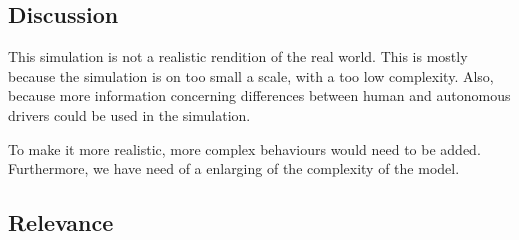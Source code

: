 

\subsection{Discussion}
\label{sub:conclusion:discussion}




This simulation is not a realistic rendition of the real world. This is mostly because the simulation is on too small a scale, with a too low complexity. Also, because more information concerning differences between human and autonomous drivers could be used in the simulation. 

To make it more realistic, more complex behaviours would need to be added. Furthermore, we have need of a enlarging of the complexity of the model.


\subsection{Relevance}
\label{sub:conclusion:relevance}
